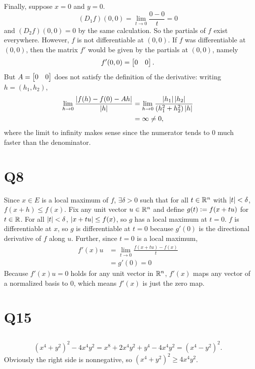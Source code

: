 \documentclass[12pt]{article}
\begin{document}
Finally, suppose $x = 0$ and $y = 0$. 
$$(D_1 f)(0, 0) = \lim_{t \rightarrow 0} \frac{0 - 0}{t} = 0$$
and $(D_2 f)(0, 0) = 0$ by the same calculation. 
So the partials of $f$ exist everywhere. 
However, $f$ is not differentiable at $(0, 0)$. 
If $f$ was differentiable at $(0, 0)$, then the matrix $f'$ would be given by the partials at $(0, 0)$, namely 
$$f'(0, 0) = \begin{bmatrix}0 & 0\end{bmatrix}.$$
But $A = \begin{bmatrix}0 & 0\end{bmatrix}$ does not satisfy the definition of the derivative:
writing $h = (h_1, h_2)$, 
\begin{align*}
  \lim_{h \rightarrow 0} \frac{\left|f(h) - f(0) - Ah\right|}{\left|h\right|} 
  & = \lim_{h \rightarrow 0} \frac{\left|h_1\right|\left|h_2\right|}{(h_{1}^{2} + h_{2}^{2})\left|h\right|} \\ 
  & = \infty \neq 0,
\end{align*}
where the limit to infinity makes sense since the numerator tends to 0 much faster than the denominator. 

\section*{Q8}
Since $x \in E$ is a local maximum of $f$, $\exists \delta > 0$ such that for all $t \in \mathbb{R}^n$ with $\left|t\right| < \delta$, $f(x + h) \leq f(x)$. 
Fix any unit vector $u \in \mathbb{R}^n$ and define $g(t) \vcentcolon= f(x + tu)$ for $t \in \mathbb{R}$. 
For all $\left|t\right| < \delta$, $\left|x + tu\right| \leq f(x)$, so $g$ has a local maximum at $t = 0$. 
$f$ is differentiable at $x$, so $g$ is differentiable at $t = 0$ because $g'(0)$ is the directional derivative of $f$ along $u$. 
Further, since $t = 0$ is a local maximum, 
\begin{align*}
  f'(x)u & = \lim_{t \rightarrow 0} \frac{f(x + tu) - f(x)}{t} \\ 
         & = g'(0) = 0
\end{align*}
Because $f'(x)u = 0$ holds for any unit vector in $\mathbb{R}^n$, $f'(x)$ maps any vector of a normalized basis to 0, which means $f'(x)$ is just the zero map. 

\section*{Q15}
\subsection{}
$$(x^4 + y^2)^2 - 4x^4 y^2 = x^8 + 2x^4 y^2 + y^4 - 4x^4 y^2 = (x^4 - y^2)^2.$$
Obviously the right side is nonnegative, so $(x^4 + y^2)^2 \geq 4x^4 y^2$. 
\end{document}
